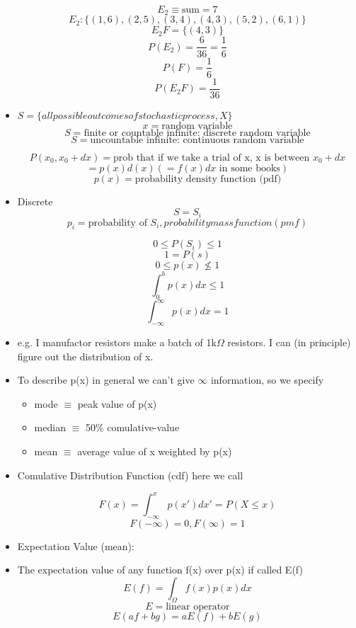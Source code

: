 \begin{itemize}
    \[ E_2 \equiv \text{sum} = 7 \]
    \[ E_2: \{(1,6), (2,5), (3,4), (4,3), (5,2), (6,1)\} \]
    \[ E_2 F = \{(4,3)\} \]
    \[ P(E_2 ) = \frac{6}{36}  = \frac{1}{6}\]
    \[ P(F) = \frac{1}{6}\]
    \[ P(E_2 F) = \frac{1}{36} \]

    \item $S = \{ all possible outcomes of stochastic process, X\} $
    \[ x = \text{random variable} \]
    \[ S = \text{finite or countable infinite: discrete random variable}\]
    \[ S = \text{uncountable infinite: continuous random variable}\]

    \[ P(x_0, x_0 + dx) = \text{prob that if we take a trial of x, x is between } x_0 + dx\]
    \[ = p(x) d(x) (= f(x) dx \text{ in some books})\]
    \[ p(x) = \text{probability density function (pdf)}\]
    \item Discrete 
    \[ S = S_i \] 
    \[ p_i = \text{probability of } S_i , probability mass function (pmf)\]

    \[ 0 \leq P(S_i) \leq 1\]
    \[ 1 = P(s) \] 
    \[ 0 \leq p(x) \nleq 1 \] 
    \[ \int_0^b p(x) dx \leq 1 \]
    \[ \int_{-\infty}^{\infty} p(x) dx = 1 \]

    \item e.g. I manufactor resistors make a batch of 1k$\Omega$ resistors. I can (in principle) figure out the distribution of x.
    
    \item To describe p(x) in general we can't give $\infty$ information, so we specify
    \begin{itemize}
        \item mode $\equiv$ peak value of p(x)
        \item median $\equiv$ 50\% comulative-value
        \item mean $\equiv$ average value of x weighted by p(x)
    \end{itemize}

    \item Comulative Distribution Function (cdf) here we call 
    
    \[ F(x) = \int_{-\infty}^{x} p(x') dx' = P(X \leq x) \]
    \[ F(-\infty) = 0, F(\infty) = 1\]

    \item Expectation Value (mean):
    \item The expectation value of any function f(x) over p(x) if called E(f)   
    \[ E(f) = \int_{\Omega} f(x) p(x) dx \]
    \[ E = \text{linear operator}\]
    \[ E(af +bg) = aE(f) + bE(g)\]


\end{itemize}
